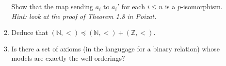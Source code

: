 \documentclass{amsart}
\theoremstyle{definition}
\begin{document}
\begin{enumerate}
\begin{enumerate}
    Show that the map sending $a_i$ to $a_i'$ for each $i \le n$ is a $p$-isomorphism. \emph{Hint: look at the proof of Theorem 1.8 in Poizat.}
    
  \item Deduce that $(\mathbb{N}, <) \preceq (\mathbb{N}, <) + (\mathbb{Z}, <)$. 
  \item Is there a set of axioms (in the langugage for a binary relation) whose models are exactly the well-orderings? 
  \end{enumerate}
\end{enumerate}



\end{document}
